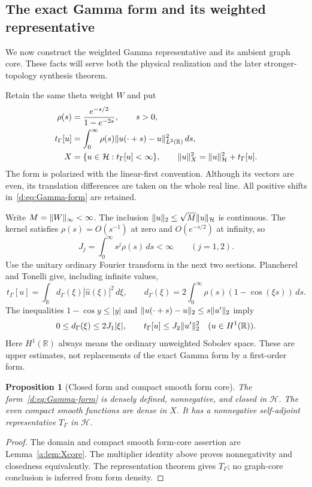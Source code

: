 \documentclass[11pt,a4paper]{article}
\numberwithin{equation}{section}
\newtheorem{proposition}[theorem]{Proposition}
\theoremstyle{definition}\newtheorem{definition}[theorem]{Definition}
\theoremstyle{remark}\newtheorem{remark}[theorem]{Remark}
\newcommand{\R}{\mathbb R}\newcommand{\C}{\mathbb C}\newcommand{\N}{\mathbb N}
\newcommand{\Hh}{\mathcal H}\newcommand{\Hw}{\mathcal H}
\newcommand{\tg}{t_\Gamma}\newcommand{\cg}{c_\Gamma}
\begin{document}
\subsection{The exact Gamma form and its weighted representative}\label{d:sec:Gamma-form}

We now construct the weighted Gamma representative and its ambient graph core. These facts will serve both the physical realization and the later stronger-topology synthesis theorem.

Retain the same theta weight $W$ and put
\begin{align}
 \rho(s)&=\frac{e^{-s/2}}{1-e^{-2s}},\qquad s>0,\label{d:eq:Gamma-rho}\\
 \tg[u]&=\int_0^\infty\rho(s)
       \norm{u(\cdot+s)-u}_{L^2(\R)}^2\,ds,\label{d:eq:Gamma-form}\\
 {X}&=\{u\in\Hh:\tg[u]<\infty\},\qquad
 \norm{u}_{{X}}^2=\norm{u}_{\Hh}^2+\tg[u].
 \label{d:eq:Gamma-X}
\end{align}
The form is polarized with the linear-first convention. Although its vectors are even, its translation differences are taken on the whole real line. All positive shifts in~\eqref{d:eq:Gamma-form} are retained.

Write $M=\lVert W\rVert_\infty<\infty$. The inclusion
$\norm{u}_2\le\sqrt M\norm{u}_{\Hh}$ is continuous. The kernel satisfies $\rho(s)=O(s^{-1})$ at zero and $O(e^{-s/2})$ at infinity, so
\begin{equation}\label{d:eq:Gamma-J}
 J_j=\int_0^\infty s^j\rho(s)\,ds<\infty\qquad(j=1,2).
\end{equation}
Use the unitary ordinary Fourier transform in the next two sections. Plancherel and Tonelli give, including infinite values,
\begin{equation}\label{d:eq:Gamma-multiplier}
 \tg[u]=\int_\R d_\Gamma(\xi)|\widehat u(\xi)|^2\,d\xi,
 \qquad d_\Gamma(\xi)=2\int_0^\infty\rho(s)(1-\cos(\xi s))\,ds.
\end{equation}
The inequalities $1-\cos y\le |y|$ and
$\lVert u(\cdot+s)-u\rVert_2\le s\lVert u'\rVert_2$ imply
\begin{equation}\label{d:eq:Gamma-first-order}
 0\le d_\Gamma(\xi)\le2J_1|\xi|,\qquad
 \tg[u]\le J_2\norm{u'}_2^2
 \quad(u\in H^1(\R)).
\end{equation}
Here $H^1(\R)$ always means the ordinary unweighted Sobolev space. These are upper estimates, not replacements of the exact Gamma form by a first-order form.

\begin{proposition}[Closed form and compact smooth form core]\label{d:prop:Gamma-form-core}
The form~\eqref{d:eq:Gamma-form} is densely defined, nonnegative, and closed in $\Hh$. The even compact smooth functions are dense in ${X}$. It has a nonnegative self-adjoint representative $T_\Gamma$ in $\Hh$.
\end{proposition}
\begin{proof}
The domain and compact smooth form-core assertion are Lemma~\ref{a:lem:Xcore}. The multiplier identity above proves nonnegativity and closedness equivalently. The representation theorem gives $T_\Gamma$; no graph-core conclusion is inferred from form density.
\end{proof}
\end{document}
